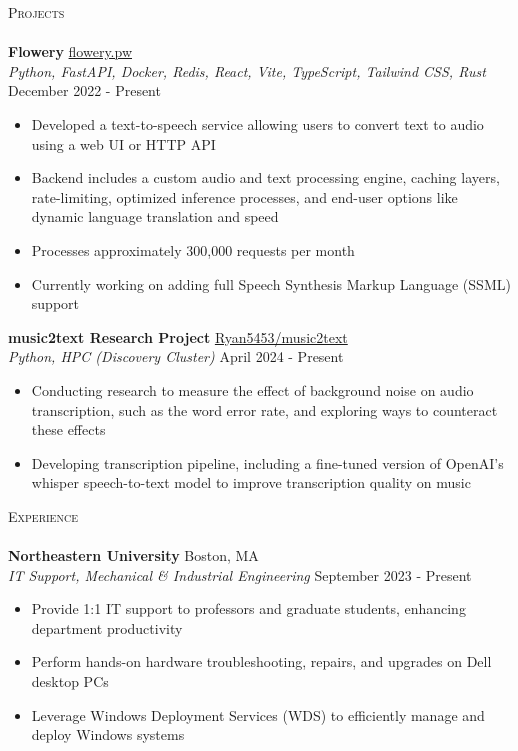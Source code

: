 \documentclass[a4paper, 10pt]{article}
\newcommand{\lineunder}{
    \vspace*{-8pt} \\
    \hspace*{-18pt} \hrulefill \\
}
\newcommand{\header}[1]{
    {\hspace*{-18pt}\vspace*{6pt} \textsc{#1}}
    \vspace*{-6pt} \lineunder
}
\begin{document}
\header{Projects}
\textbf{Flowery} \hfill  {} \href{https://flowery.pw}{flowery.pw}\\
\textit{Python, FastAPI, Docker, Redis, React, Vite, TypeScript, Tailwind CSS, Rust} \hfill December 2022 - Present\\
\begin{itemize} \itemsep 1pt
    \item Developed a text-to-speech service allowing users to convert text to audio using a web UI or HTTP API
    \item Backend includes a custom audio and text processing engine, caching layers, rate-limiting, optimized inference processes, and end-user options like dynamic language translation and speed
    \item Processes approximately 300,000 requests per month
    \item Currently working on adding full Speech Synthesis Markup Language (SSML) support
\end{itemize}

\textbf{music2text Research Project} \hfill {} \href{https://github.com/Ryan5453/music2text}{Ryan5453/music2text}\\
\textit{Python, HPC (Discovery Cluster)} \hfill April 2024 - Present\\
\begin{itemize} \itemsep 1pt
\item Conducting research to measure the effect of background noise on audio transcription, such as the word error rate, and exploring ways to counteract these effects    
\item Developing transcription pipeline, including a fine-tuned version of OpenAI's whisper speech-to-text model to improve transcription quality on music
\end{itemize}


\header{Experience}

\textbf{Northeastern University} \hfill Boston, MA\\
\textit{IT Support, Mechanical \& Industrial Engineering} \hfill September 2023 - Present
\begin{itemize}
    \item Provide 1:1 IT support to professors and graduate students, enhancing department productivity
    \item Perform hands-on hardware troubleshooting, repairs, and upgrades on Dell desktop PCs
    \item Leverage Windows Deployment Services (WDS) to efficiently manage and deploy Windows systems
\end{itemize}
\end{document}
